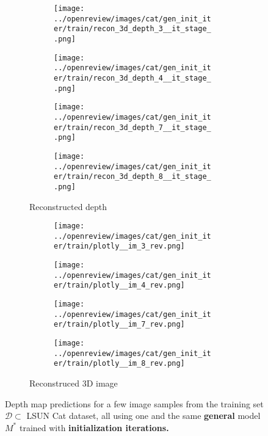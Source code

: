 \begin{figure}[!htb]
\begin{subfigure}{\textwidth}
    \begin{subfigure}{0.24\textwidth}
    \centering
    \texttt{[image: ../openreview/images/cat/gen\_init\_iter/train/recon\_3d\_depth\_3\_\_it\_stage\_.png]}
\end{subfigure}
\begin{subfigure}{0.24\textwidth}
    \centering
    \texttt{[image: ../openreview/images/cat/gen\_init\_iter/train/recon\_3d\_depth\_4\_\_it\_stage\_.png]}
\end{subfigure}
\begin{subfigure}{0.24\textwidth}
    \centering
    \texttt{[image: ../openreview/images/cat/gen\_init\_iter/train/recon\_3d\_depth\_7\_\_it\_stage\_.png]}
\end{subfigure}
\begin{subfigure}{0.24\textwidth}
    \centering
    \texttt{[image: ../openreview/images/cat/gen\_init\_iter/train/recon\_3d\_depth\_8\_\_it\_stage\_.png]}
\end{subfigure}
    \caption{Reconstructed depth}
\end{subfigure}
\begin{subfigure}{\textwidth}
    \begin{subfigure}{0.24\textwidth}
    \centering
    \texttt{[image: ../openreview/images/cat/gen\_init\_iter/train/plotly\_\_im\_3\_rev.png]}
\end{subfigure}
\begin{subfigure}{0.24\textwidth}
    \centering
    \texttt{[image: ../openreview/images/cat/gen\_init\_iter/train/plotly\_\_im\_4\_rev.png]}
\end{subfigure}
\begin{subfigure}{0.24\textwidth}
    \centering
    \texttt{[image: ../openreview/images/cat/gen\_init\_iter/train/plotly\_\_im\_7\_rev.png]}
\end{subfigure}
\begin{subfigure}{0.24\textwidth}
    \centering
    \texttt{[image: ../openreview/images/cat/gen\_init\_iter/train/plotly\_\_im\_8\_rev.png]}
\end{subfigure}
\caption{Reconstruced 3D image}
\end{subfigure}
    \caption{Depth map predictions for a few image samples from the training set $\mathcal{D} \subset$ LSUN Cat dataset, all using one and the same \textbf{general} model $M^*$ trained with \textbf{initialization iterations.}}
    \label{fig:init_iter_general}
\end{figure}
